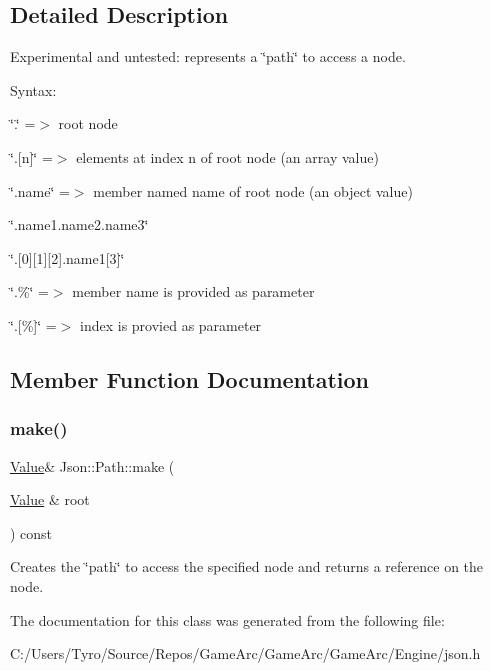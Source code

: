 \subsection{Detailed Description}
Experimental and untested\+: represents a \char`\"{}path\char`\"{} to access a node. 

Syntax\+:
\begin{DoxyItemize}
\item \char`\"{}.\char`\"{} =$>$ root node
\item \char`\"{}.\mbox{[}n\mbox{]}\char`\"{} =$>$ elements at index \textquotesingle{}n\textquotesingle{} of root node (an array value)
\item \char`\"{}.\+name\char`\"{} =$>$ member named \textquotesingle{}name\textquotesingle{} of root node (an object value)
\item \char`\"{}.\+name1.\+name2.\+name3\char`\"{}
\item \char`\"{}.\mbox{[}0\mbox{]}\mbox{[}1\mbox{]}\mbox{[}2\mbox{]}.\+name1\mbox{[}3\mbox{]}\char`\"{}
\item \char`\"{}.\%\char`\"{} =$>$ member name is provided as parameter
\item \char`\"{}.\mbox{[}\%\mbox{]}\char`\"{} =$>$ index is provied as parameter 
\end{DoxyItemize}

\subsection{Member Function Documentation}
\mbox{\label{class_json_1_1_path_ad32b95567b035727b39e0a3b0a675d3f}} 
\subsubsection{\texorpdfstring{make()}{make()}}
{\footnotesize\ttfamily \mbox{\hyperlink{class_json_1_1_value}{Value}}\& Json\+::\+Path\+::make (\begin{DoxyParamCaption}\item[{\mbox{\hyperlink{class_json_1_1_value}{Value}} \&}]{root }\end{DoxyParamCaption}) const}

Creates the \char`\"{}path\char`\"{} to access the specified node and returns a reference on the node. 

The documentation for this class was generated from the following file\+:\begin{DoxyCompactItemize}
\item 
C\+:/\+Users/\+Tyro/\+Source/\+Repos/\+Game\+Arc/\+Game\+Arc/\+Game\+Arc/\+Engine/json.\+h\end{DoxyCompactItemize}
